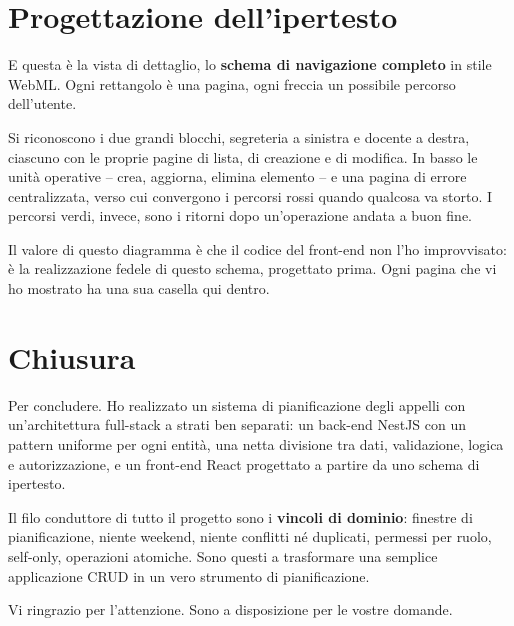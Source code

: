 \documentclass[11pt]{article}
\begin{document}
\section*{Progettazione dell'ipertesto}

E questa è la vista di dettaglio, lo \textbf{schema di navigazione completo} in stile
WebML. Ogni rettangolo è una pagina, ogni freccia un possibile percorso dell'utente.

Si riconoscono i due grandi blocchi, segreteria a sinistra e docente a destra, ciascuno
con le proprie pagine di lista, di creazione e di modifica. In basso le unità operative
-- crea, aggiorna, elimina elemento -- e una pagina di errore centralizzata, verso cui
convergono i percorsi rossi quando qualcosa va storto. I percorsi verdi, invece, sono i
ritorni dopo un'operazione andata a buon fine.

Il valore di questo diagramma è che il codice del front-end non l'ho improvvisato: è la
realizzazione fedele di questo schema, progettato prima. Ogni pagina che vi ho mostrato
ha una sua casella qui dentro.

\section*{Chiusura}

Per concludere. Ho realizzato un sistema di pianificazione degli appelli con
un'architettura full-stack a strati ben separati: un back-end NestJS con un pattern
uniforme per ogni entità, una netta divisione tra dati, validazione, logica e
autorizzazione, e un front-end React progettato a partire da uno schema di ipertesto.

Il filo conduttore di tutto il progetto sono i \textbf{vincoli di dominio}: finestre di
pianificazione, niente weekend, niente conflitti né duplicati, permessi per ruolo,
self-only, operazioni atomiche. Sono questi a trasformare una semplice applicazione CRUD
in un vero strumento di pianificazione.

Vi ringrazio per l'attenzione. Sono a disposizione per le vostre domande.
\end{document}

